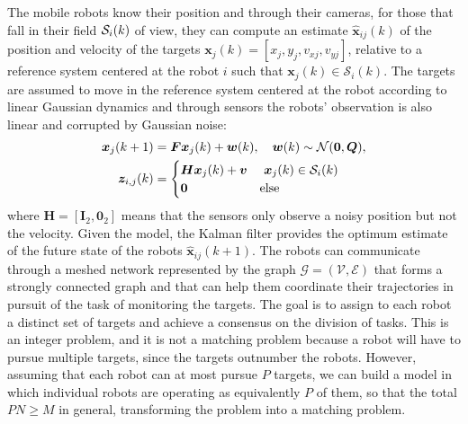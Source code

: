 \documentclass[11pt,draftclsnofoot,onecolumn]{IEEEtran}
\begin{document}
The mobile robots know their position and through their cameras, for those that fall in their field ${\cal S}_i(k)$ of view, they can compute an estimate $\hat{
\bm x}_{ij}(k)$ of the position and velocity of the targets $\bm x_j(k)=[x_j,y_j,v_{xj},v_{yj}]$, relative to a reference system centered at the robot $i$ such that $\bm x_j(k)\in\mathcal{S}_i(k)$.
The targets are assumed to move in the reference system centered at the robot according to linear Gaussian dynamics and through sensors the robots' observation is also linear and corrupted by Gaussian noise:
\begin{align}
        \bm x_j(k+1)&=\bm F\bm x_j(k) +\bm w(k),~~~
    \bm w(k)\sim \mathcal{N}(\bm 0,\bm Q),\\
    \bm z_{i,j}(k)&=
    \begin{cases}
        \bm H \bm x_j(k)+\bm v &~ \bm x_j(k)\in {\cal S}_i(k)\\
        \bm 0 &\mbox{else}
    \end{cases}
\end{align}
where $\bm H=[\bm I_2,\bm 0_2]$ means that the sensors only observe a noisy position but not the velocity.  Given the model, the Kalman filter provides the optimum estimate of the future state of the robots $\hat{\bm x}_{ij}(k+1)$. 
The robots can communicate through a meshed network represented by the graph $\mathcal{G}=(\mathcal{V},\mathcal{E})$ that forms a strongly connected graph and that can help them coordinate their trajectories in pursuit of the task of monitoring the targets. 
The goal is to assign to each robot a distinct set of targets and achieve a consensus on the division of tasks. This is an integer problem, and it is not a matching problem because a robot will have to pursue multiple targets, since the targets outnumber the robots. However, assuming that each robot can at most pursue $P$ targets, we can build a model in which individual robots are operating as equivalently $P$ of them, so that the total $PN\geq M$ in general, transforming the problem into a matching problem. 
\end{document}
